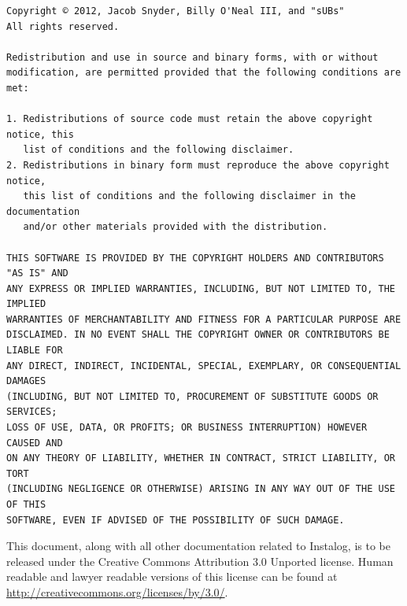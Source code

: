 \documentclass[letterpaper,12pt]{article}
\begin{document}
\begin{verbatim}
Copyright © 2012, Jacob Snyder, Billy O'Neal III, and "sUBs"
All rights reserved.

Redistribution and use in source and binary forms, with or without
modification, are permitted provided that the following conditions are met: 

1. Redistributions of source code must retain the above copyright notice, this
   list of conditions and the following disclaimer. 
2. Redistributions in binary form must reproduce the above copyright notice,
   this list of conditions and the following disclaimer in the documentation
   and/or other materials provided with the distribution. 

THIS SOFTWARE IS PROVIDED BY THE COPYRIGHT HOLDERS AND CONTRIBUTORS "AS IS" AND
ANY EXPRESS OR IMPLIED WARRANTIES, INCLUDING, BUT NOT LIMITED TO, THE IMPLIED
WARRANTIES OF MERCHANTABILITY AND FITNESS FOR A PARTICULAR PURPOSE ARE
DISCLAIMED. IN NO EVENT SHALL THE COPYRIGHT OWNER OR CONTRIBUTORS BE LIABLE FOR
ANY DIRECT, INDIRECT, INCIDENTAL, SPECIAL, EXEMPLARY, OR CONSEQUENTIAL DAMAGES
(INCLUDING, BUT NOT LIMITED TO, PROCUREMENT OF SUBSTITUTE GOODS OR SERVICES;
LOSS OF USE, DATA, OR PROFITS; OR BUSINESS INTERRUPTION) HOWEVER CAUSED AND
ON ANY THEORY OF LIABILITY, WHETHER IN CONTRACT, STRICT LIABILITY, OR TORT
(INCLUDING NEGLIGENCE OR OTHERWISE) ARISING IN ANY WAY OUT OF THE USE OF THIS
SOFTWARE, EVEN IF ADVISED OF THE POSSIBILITY OF SUCH DAMAGE.
\end{verbatim}

This document, along with all other documentation related to Instalog,  is to be
released under the Creative Commons Attribution 3.0 Unported license. Human
readable and lawyer readable versions of this license can be found at
\url{http://creativecommons.org/licenses/by/3.0/}.

\newpage
\end{document}
